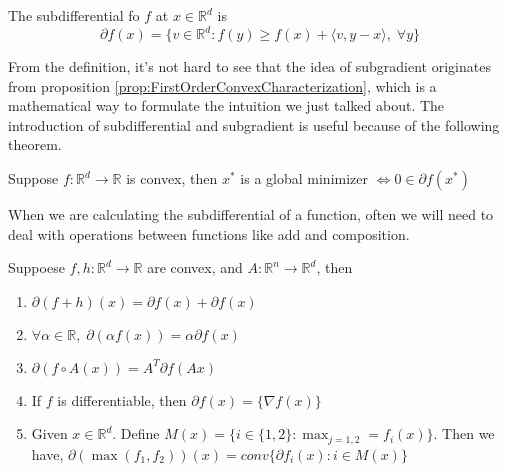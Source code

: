\begin{definition}[Subdifferential]
    The subdifferential fo $f$ at $x \in \mathbb{R}^d$ is
    \begin{equation*}
        \partial f(x) = \{ v \in \mathbb{R}^d : f(y) \geq f(x) + \langle v, y-x \rangle,\; \forall y\}
    \end{equation*}
\end{definition}

From the definition, it's not hard to see that the idea of subgradient originates from proposition \ref{prop:FirstOrderConvexCharacterization}, which is a mathematical way to formulate the intuition we just talked about. The introduction of subdifferential and subgradient is useful because of the following theorem.

\begin{theorem}
    Suppose $f: \mathbb{R}^d \rightarrow \mathbb{R}$ is convex, then $x^*$ is a global minimizer $\iff 0 \in \partial f(x^*)$
\end{theorem}

When we are calculating the subdifferential of a function, often we will need to deal with operations between functions like add and composition. 

\begin{proposition}
    Suppoese $f, h: \mathbb{R}^d \rightarrow \mathbb{R}$ are convex, and $A:\mathbb{R}^n \rightarrow \mathbb{R}^d$, then
    \begin{enumerate}
        \item $\partial(f+h)(x) = \partial f(x) + \partial f(x)$
        \item $\forall \alpha \in \mathbb{R}, \; \partial(\alpha f(x)) = \alpha \partial f(x)$
        \item $\partial(f \circ A(x)) = A^T \partial f(Ax)$
        \item If $f$ is differentiable, then $\partial f(x) = \{ \nabla f(x) \}$
        \item Given $x \in \mathbb{R}^d$. Define $M(x) = \{ i \in \{1,2\} : \max_{j=1,2} = f_i(x) \}$. Then we have, $\partial(\max(f_1, f_2))(x) = conv\{ \partial f_i(x) : i \in M(x) \}$
    \end{enumerate}    
\end{proposition}
